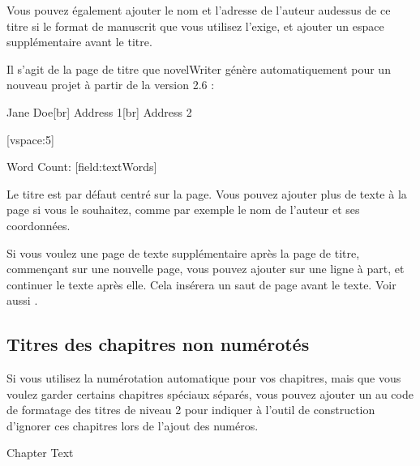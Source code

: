 \documentclass[a4paper,11pt,french]{sphinxmanual}
\begin{document}
\sphinxAtStartPar
Vous pouvez également ajouter le nom et l’adresse de l’auteur au\sphinxhyphen{}dessus de ce titre si le format de manuscrit que vous utilisez l’exige, et ajouter un espace supplémentaire avant le titre.

\sphinxAtStartPar
Il s’agit de la page de titre que novelWriter génère automatiquement pour un nouveau projet à partir de la version 2.6 :

\begin{sphinxVerbatim}[commandchars=\\\{\}]
Jane Doe[br]
Address 1[br]
Address 2 \PYGZlt{}\PYGZlt{}

[vspace:5]


\PYGZgt{}\PYGZgt{}  \PYGZlt{}\PYGZlt{}

\PYGZgt{}\PYGZgt{} Word Count: [field:textWords] \PYGZlt{}\PYGZlt{}
\end{sphinxVerbatim}

\sphinxAtStartPar
Le titre est par défaut centré sur la page. Vous pouvez ajouter plus de texte à la page si vous le souhaitez, comme par exemple le nom de l’auteur et ses coordonnées.

\sphinxAtStartPar
Si vous voulez une page de texte supplémentaire après la page de titre, commençant sur une nouvelle page, vous pouvez ajouter  sur une ligne à part, et continuer le texte après elle. Cela insérera un saut de page avant le texte. Voir aussi {\hyperref[\detokenize{usage_format:a-fmt-break}]{}}.


\subsection{Titres des chapitres non numérotés}
\label{\detokenize{project_structure:unnumbered-chapter-headings}}\label{\detokenize{project_structure:a-struct-heads-unnum}}
\sphinxAtStartPar
Si vous utilisez la numérotation automatique pour vos chapitres, mais que vous voulez garder certains chapitres spéciaux séparés, vous pouvez ajouter un \sphinxtitleref{!} au code de formatage des titres de niveau 2 pour indiquer à l’outil de construction d’ignorer ces chapitres lors de l’ajout des numéros.

\begin{sphinxVerbatim}[commandchars=\\\{\}]

Chapter Text
\end{sphinxVerbatim}
\end{document}
